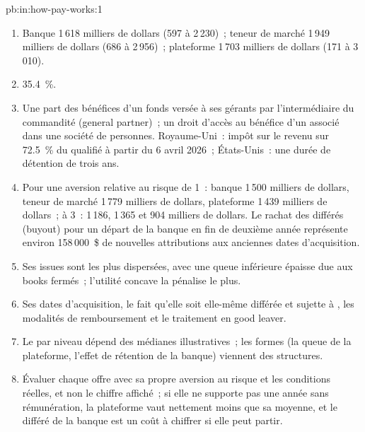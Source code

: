 \begin{solution}{pb:in:how-pay-works:1}
\begin{enumerate}
base 200\,000, attribution médiane 250\,000 en numéraire~; base de la plateforme 175\,000, 2~\% du résultat du book, fermé après une perte
au-delà de 10~millions,  100\,000 et  150\,000. Cinq ans, 10~\% de risque de départ, 5~\% de taux d'actualisation, 500\,000
de richesse.
\item Banque 1\,618 milliers de dollars (597 à 2\,230)~; teneur de marché 1\,949 milliers de dollars (686 à 2\,956)~; plateforme 1\,703 milliers de dollars
(171 à 3\,010).
\item 35.4~\%.
\item Une part des bénéfices d'un fonds versée à ses gérants par l'intermédiaire du commandité (general partner)~; un droit d'accès au bénéfice d'un associé dans une
société de personnes. Royaume-Uni~: impôt sur le revenu sur 72.5~\% du  qualifié à partir du 6 avril 2026~; États-Unis~: une durée de détention de trois ans.
\item Pour une aversion relative au risque de 1~: banque 1\,500 milliers de dollars, teneur de marché 1\,779 milliers de dollars, plateforme 1\,439 milliers de dollars~; à
3~: 1\,186, 1\,365 et 904 milliers de dollars. Le rachat des différés (buyout) pour un départ de la banque en fin de deuxième année représente environ 158\,000~\$
de nouvelles attributions aux anciennes dates d'acquisition.
\item Ses issues sont les plus dispersées, avec une queue inférieure épaisse due aux books fermés~; l'utilité concave la pénalise le plus.
\item Ses dates d'acquisition, le fait qu'elle soit elle-même différée et sujette à , les modalités de remboursement et le traitement en good leaver.
\item Le  par niveau dépend des médianes illustratives~; les formes (la queue de la plateforme, l'effet de rétention de la banque) viennent
des structures.
\item Évaluer chaque offre avec sa propre aversion au risque et les conditions réelles, et non le chiffre affiché~; si elle ne supporte pas une année sans
rémunération, la plateforme vaut nettement moins que sa moyenne, et le différé de la banque est un coût à chiffrer si elle peut partir.
\end{enumerate}
\end{solution}

